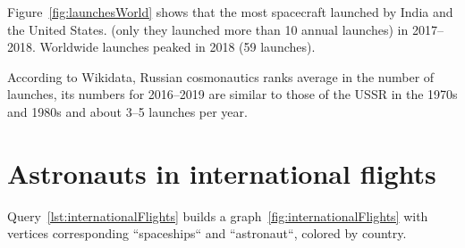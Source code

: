 Figure~\ref{fig:launchesWorld} shows that the most spacecraft 
launched by India and the United States. 
(only they launched more than 10 annual launches) in 2017--2018. 
Worldwide launches peaked in 2018 (59 launches). 

According to Wikidata, Russian cosmonautics ranks average in the number of launches, 
its numbers for 2016--2019 are similar to those of the USSR in the 1970s and 1980s 
and about 3--5 launches per year.

\label{question:spacecraft_2}

\section{Astronauts in international flights}

Query~\ref{lst:internationalFlights} builds a graph~\ref{fig:internationalFlights} with vertices corresponding ``spaceships`` and ``astronaut``, colored by country.

